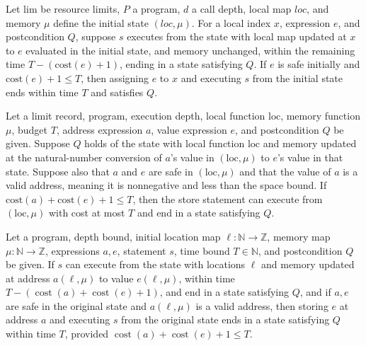 \begin{theorem}
\label{Light.Ends.setThen}
\leanok
{}
Let $\mathrm{lim}$ be resource limits, $P$ a program, $d$ a call depth, local map $loc$, and
memory $\mu$ define the initial state $(loc,\mu)$. For a local index $x$, expression $e$,
and postcondition $Q$, suppose $s$ executes from the state with local map updated at $x$ to
$e$ evaluated in the initial state, and memory unchanged, within the remaining time
$T-(\mathrm{cost}(e)+1)$, ending in a state satisfying $Q$. If $e$ is safe initially and
$\mathrm{cost}(e)+1\le T$, then assigning $e$ to $x$ and executing $s$ from the initial state
ends within time $T$ and satisfies $Q$.
\end{theorem}

\begin{theorem}
\label{Light.Ends.storeLast}
\leanok
{}
Let a limit record, program, execution depth, local function $\mathrm{loc}$, memory
function $\mu$, budget $T$, address expression $a$, value expression $e$, and
postcondition $Q$ be given. Suppose $Q$ holds of the state with local function
$\mathrm{loc}$ and memory updated at the natural-number conversion of $a$'s value in
$(\mathrm{loc},\mu)$ to $e$'s value in that state. Suppose also that $a$ and $e$ are
safe in $(\mathrm{loc},\mu)$ and that the value of $a$ is a valid address, meaning it is
nonnegative and less than the space bound. If $\mathrm{cost}(a)+\mathrm{cost}(e)+1\le
T$, then the store statement can execute from $(\mathrm{loc},\mu)$ with cost at most $T$
and end in a state satisfying $Q$.
\end{theorem}

\begin{theorem}
\label{Light.Ends.storeThen}
\leanok
{}
Let a program, depth bound, initial location map $\ell:\mathbb N\to\mathbb Z$, memory
map $\mu:\mathbb N\to\mathbb Z$, expressions $a,e$, statement $s$, time bound
$T\in\mathbb N$, and postcondition $Q$ be given. If $s$ can execute from the state with
locations $\ell$ and memory updated at address $a(\ell,\mu)$ to value $e(\ell,\mu)$,
within time $T-(\operatorname{cost}(a)+\operatorname{cost}(e)+1)$, and end in a state
satisfying $Q$, and if $a,e$ are safe in the original state and $a(\ell,\mu)$ is a valid
address, then storing $e$ at address $a$ and executing $s$ from the original state ends
in a state satisfying $Q$ within time $T$, provided
$\operatorname{cost}(a)+\operatorname{cost}(e)+1\le T$.
\end{theorem}


